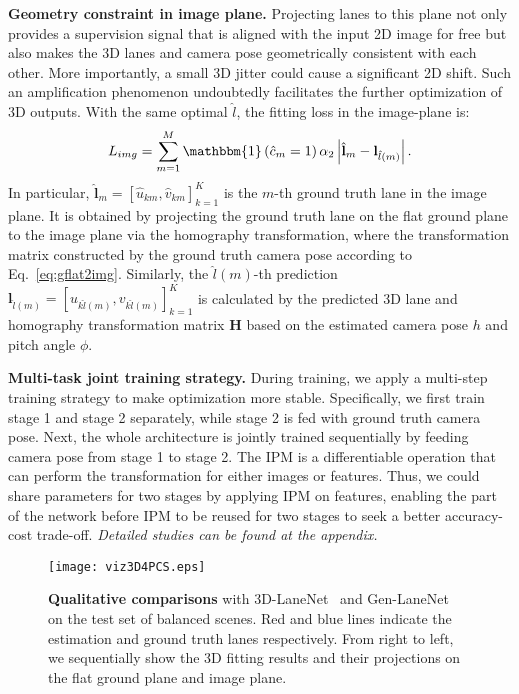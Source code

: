 \documentclass[letterpaper]{article} \usepackage{aaai22}  \usepackage{times}  \usepackage{helvet}  \usepackage{courier}  \usepackage[hyphens]{url}  \usepackage{graphicx} \urlstyle{rm} \def\UrlFont{\rm}  \usepackage{natbib}  \usepackage{caption}
\begin{document}
\noindent \textbf{Geometry constraint in image plane.}
Projecting lanes to this plane not only provides a supervision signal that is aligned with the input 2D image for free but also makes the 3D lanes and camera pose geometrically consistent with each other. More importantly, a small 3D jitter could cause a significant 2D shift. Such an amplification phenomenon undoubtedly facilitates the further optimization of 3D outputs. With the same optimal $\hat{l}$, the fitting loss in the image-plane is:
\begin{equation}
\label{lossinimg}
\begin{split}
L_{img} = \sum_{m=1}^M \mathbbm{1}\left(\hat{c}_m = 1\right) \alpha_2 \left|\hat{\mathbf{l}}_m- \mathbf{l}_{\hat{l}\left(m\right)} \right|.
\end{split}
\end{equation}
In particular, $\hat{\mathbf{l}}_m=\left[\hat{u}_{km},\hat{v}_{km}\right]_{k=1}^K$ is the $m$-th ground truth lane in the image plane. It is obtained by projecting the ground truth lane on the flat ground plane to the image plane via the homography transformation, where the transformation matrix constructed by the ground truth camera pose according to   
Eq.~\ref{eq:gflat2img}. Similarly, the $\hat{l}\left(m\right)$-th prediction $\mathbf{l}_{\hat{l}\left(m\right)}=\left[u_{k\hat{l}\left(m\right)},v_{k\hat{l}\left(m\right)}\right]_{k=1}^K$ is calculated by the predicted 3D lane and homography transformation matrix $\mathbf{H}$ based on the estimated camera pose $h$ and pitch angle $\phi$.



\noindent \textbf{Multi-task joint training strategy.} During training, we apply a multi-step training strategy to make optimization more stable. Specifically, we first train stage 1 and stage 2 separately, while stage 2 is fed with ground truth camera pose. Next, the whole architecture is jointly trained sequentially by feeding camera pose from stage 1 to stage 2. The IPM is a differentiable operation that can perform the transformation for either images or features. Thus, we could share parameters for two stages by applying IPM on features, enabling the part of the network before IPM to be reused for two stages to seek a better accuracy-cost trade-off. \textit{Detailed studies can be found at the appendix.}

\begin{figure*}[t]
\begin{center}
\texttt{[image: viz3D4PCS.eps]}
\end{center}
\caption{\textbf{Qualitative comparisons} with 3D-LaneNet~\cite{3DLaneNet} and Gen-LaneNet~\cite{GenLaneNet} on the test set of balanced scenes. Red and blue lines indicate the estimation and ground truth lanes respectively. From right to left, we sequentially show the 3D fitting results and their projections on the flat ground plane and image plane.}
\label{fig:qual3dlane}
\end{figure*}
\end{document}
